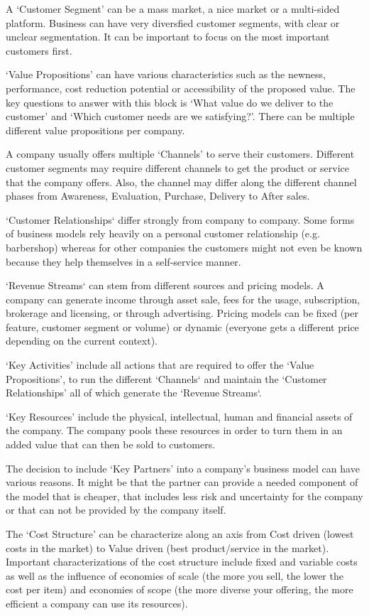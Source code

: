 		A `Customer Segment' can be a mass market, a nice market or a multi-sided platform. Business can have very diversfied customer segments, with clear or unclear segmentation. It can be important to focus on the most important customers first.

		`Value Propositions' can have various characteristics such as the newness, performance, cost reduction potential or accessibility of the proposed value. The key questions to answer with this block is `What value do we deliver to the customer' and `Which customer needs are we satisfying?'. There can be multiple different value propositions per company.

		A company usually offers multiple `Channels' to serve their customers. Different customer segments may require different channels to get the product or service that the company offers. Also, the channel may differ along the different channel phases from Awareness, Evaluation, Purchase, Delivery to After sales.

		`Customer Relationships` differ strongly from company to company. Some forms of business models rely heavily on a personal customer relationship (e.g. barbershop) whereas for other companies the customers might not even be known because they help themselves in a self-service manner.

		`Revenue Streams` can stem from different sources and pricing models. A company can generate income through asset sale, fees for the usage, subscription, brokerage and licensing, or through advertising. Pricing models can be fixed (per feature, customer segment or volume) or dynamic (everyone gets a different price depending on the current context).
 
		`Key Activities' include all actions that are required to offer the `Value Propositions', to run the different `Channels` and maintain the `Customer Relationships' all of which generate the `Revenue Streams`.

		`Key Resources' include the physical, intellectual, human and financial assets of the company. The company pools these resources in order to turn them in an added value that can then be sold to customers.

		The decision to include `Key Partners' into a company's business model can have various reasons. It might be that the partner can provide a needed component of the model that is cheaper, that includes less risk and uncertainty for the company or that can not be provided by the company itself.

		The `Cost Structure' can be characterize along an axis from Cost driven (lowest costs in the market) to Value driven (best product/service in the market). Important characterizations of the cost structure include fixed and variable costs as well as the influence of economies of scale (the more you sell, the lower the cost per item) and economies of scope (the more diverse your offering, the more efficient a company can use its resources).		
